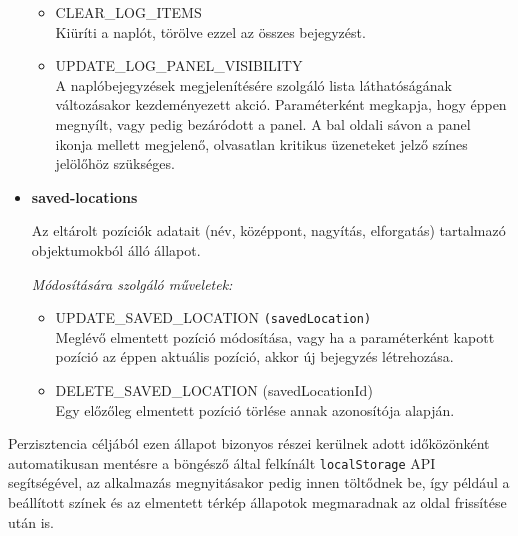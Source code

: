 \begin{itemize}
\begin{itemize}
      \item CLEAR\_LOG\_ITEMS \\
        Kiüríti a naplót, törölve ezzel az összes bejegyzést.

      \item UPDATE\_LOG\_PANEL\_VISIBILITY \\
        A naplóbejegyzések megjelenítésére szolgáló lista láthatóságának
        változásakor kezdeményezett akció. Paraméterként megkapja, hogy éppen
        megnyílt, vagy pedig bezáródott a panel.
        A bal oldali sávon a panel ikonja mellett megjelenő, olvasatlan kritikus
        üzeneteket jelző színes jelölőhöz szükséges.

    \end{itemize}

  \item \textbf{saved-locations}

    Az eltárolt pozíciók adatait (név, középpont, nagyítás, elforgatás)
    tartalmazó objektumokból álló állapot.

    \textit{Módosítására szolgáló műveletek:}

    \begin{itemize}
      \item UPDATE\_SAVED\_LOCATION \verb|(savedLocation)| \\
        Meglévő elmentett pozíció módosítása, vagy ha a paraméterként kapott
        pozíció az éppen aktuális pozíció, akkor új bejegyzés létrehozása.

      \item DELETE\_SAVED\_LOCATION (savedLocationId) \\
        Egy előzőleg elmentett pozíció törlése annak azonosítója alapján.
    \end{itemize}

\end{itemize}

\noindent Perzisztencia céljából ezen állapot bizonyos részei kerülnek adott időközönként
automatikusan mentésre a böngésző által felkínált \verb|localStorage| API
segítségével, az alkalmazás megnyitásakor pedig innen töltődnek be, így például
a beállított színek és az elmentett térkép állapotok megmaradnak az oldal
frissítése után is.
